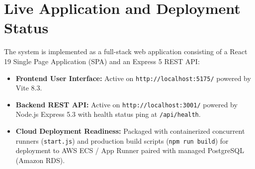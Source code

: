 \documentclass[11pt,a4paper,oneside]{report}
\begin{document}
\section{Live Application and Deployment Status}
The system is implemented as a full-stack web application consisting of a React 19 Single Page Application (SPA) and an Express 5 REST API:
\begin{itemize}[leftmargin=1.5em]
    \item \textbf{Frontend User Interface:} Active on \texttt{http://localhost:5175/} powered by Vite 8.3.
    \item \textbf{Backend REST API:} Active on \texttt{http://localhost:3001/} powered by Node.js Express 5.3 with health status ping at \texttt{/api/health}.
    \item \textbf{Cloud Deployment Readiness:} Packaged with containerized concurrent runners (\texttt{start.js}) and production build scripts (\texttt{npm run build}) for deployment to AWS ECS / App Runner paired with managed PostgreSQL (Amazon RDS).
\end{itemize}
\end{document}
